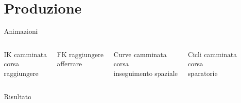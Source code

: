\documentclass[10pt]{beamer}
\begin{document}
\section{Produzione}        %
\begin{frame}{Animazioni}   %
	\begin{columns}[T,onlytextwidth]  %
    \begin{exampleblock}{IK}
		camminata\\
		corsa\\
		raggiungere
		\end{exampleblock}
		\begin{exampleblock}{FK}
		raggiungere\\
		afferrare
		\end{exampleblock}

		\begin{exampleblock}{Curve}
		camminata\\
		corsa\\
		inseguimento spaziale
		\end{exampleblock}
		\begin{exampleblock}{Cicli}
		camminata\\
		corsa\\
		sparatorie
		\end{exampleblock}
	\end{columns}
\end{frame}

{
\begin{frame}[standout]

Risultato

\end{frame}
}
\end{document}
